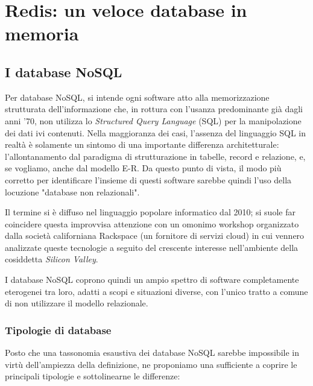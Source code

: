 \chapter{Redis: un veloce database in memoria}

\section{I database NoSQL}

Per database NoSQL, si intende ogni software atto alla memorizzazione strutturata dell'informazione
che, in rottura con l'usanza predominante già dagli anni '70, non utilizza lo \emph{Structured
Query Language} (SQL) per la manipolazione dei dati ivi contenuti. Nella maggioranza dei casi,
l'assenza del linguaggio SQL in realtà è solamente un sintomo di una importante differenza
architetturale: l'allontanamento dal paradigma di strutturazione in tabelle, record e relazione, e,
se vogliamo, anche dal modello E-R. Da questo punto di vista, il modo più corretto per identificare
l'insieme di questi software sarebbe quindi l'uso della locuzione "database non relazionali".

Il termine si è diffuso nel linguaggio popolare informatico dal 2010; si suole far
coincidere questa improvvisa attenzione con un omonimo workshop organizzato dalla società
californiana Rackspace (un fornitore di servizi cloud) in cui vennero analizzate
queste tecnologie a seguito del crescente interesse nell'ambiente della cosiddetta
\emph{Silicon Valley}.

I database NoSQL coprono quindi un ampio spettro di software completamente eterogenei
tra loro, adatti a scopi e situazioni diverse, con l'unico tratto a comune di non
utilizzare il modello relazionale.

\subsection{Tipologie di database}

Posto che una tassonomia esaustiva dei database NoSQL sarebbe impossibile in virtù
dell'ampiezza della definizione, ne proponiamo una \cite{corbellini17} sufficiente a coprire le
principali tipologie e sottolinearne le differenze:

